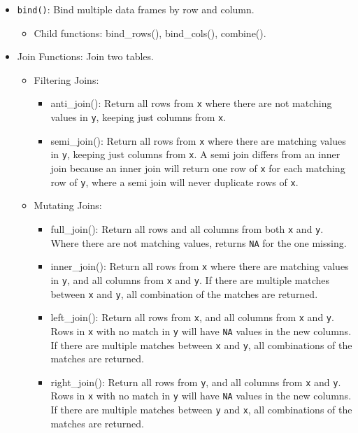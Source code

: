 \documentclass[]{book}
\providecommand{\tightlist}{%
  \setlength{\itemsep}{0pt}\setlength{\parskip}{0pt}}
\begin{document}
\begin{itemize}
\tightlist
\item
  \texttt{bind()}: Bind multiple data frames by row and column.

  \begin{itemize}
  \tightlist
  \item
    Child functions: bind\_rows(), bind\_cols(), combine().
  \end{itemize}
\item
  Join Functions: Join two tables.

  \begin{itemize}
  \tightlist
  \item
    Filtering Joins:

    \begin{itemize}
    \tightlist
    \item
      anti\_join(): Return all rows from \texttt{x} where there are not matching values in \texttt{y}, keeping just columns from \texttt{x}.
    \item
      semi\_join(): Return all rows from \texttt{x} where there are matching values in \texttt{y}, keeping just columns from \texttt{x}. A semi join differs from an inner join because an inner join will return one row of \texttt{x} for each matching row of \texttt{y}, where a semi join will never duplicate rows of \texttt{x}.
    \end{itemize}
  \item
    Mutating Joins:

    \begin{itemize}
    \tightlist
    \item
      full\_join(): Return all rows and all columns from both \texttt{x} and \texttt{y}. Where there are not matching values, returns \texttt{NA} for the one missing.
    \item
      inner\_join(): Return all rows from \texttt{x} where there are matching values in \texttt{y}, and all columns from \texttt{x} and \texttt{y}. If there are multiple matches between \texttt{x} and \texttt{y}, all combination of the matches are returned.
    \item
      left\_join(): Return all rows from \texttt{x}, and all columns from \texttt{x} and \texttt{y}. Rows in \texttt{x} with no match in \texttt{y} will have \texttt{NA} values in the new columns. If there are multiple matches between \texttt{x} and \texttt{y}, all combinations of the matches are returned.
    \item
      right\_join(): Return all rows from \texttt{y}, and all columns from \texttt{x} and \texttt{y}. Rows in \texttt{x} with no match in \texttt{y} will have \texttt{NA} values in the new columns. If there are multiple matches between \texttt{y} and \texttt{x}, all combinations of the matches are returned.
    \end{itemize}
  \end{itemize}
\end{itemize}
\end{document}
